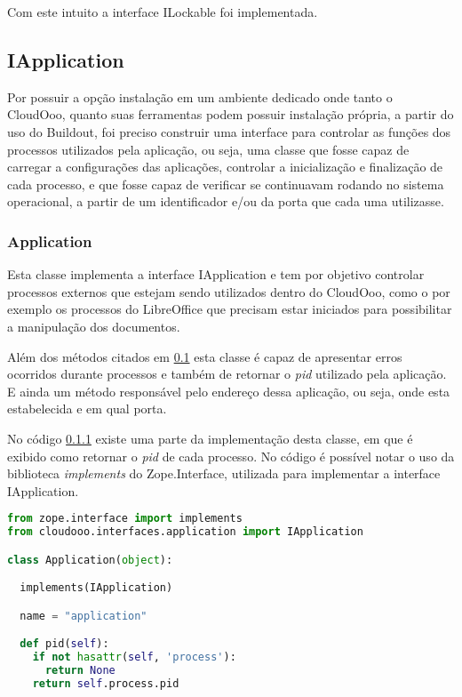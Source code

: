 Com este intuito a interface ILockable foi implementada.


\subsection{IApplication}
\label{iapplication}

Por possuir a opção instalação em um ambiente dedicado onde tanto o CloudOoo, quanto suas ferramentas podem possuir instalação própria, a partir do uso do Buildout, foi preciso construir uma interface para controlar as funções dos processos utilizados pela aplicação, ou seja, uma classe que fosse capaz de carregar a configurações das aplicações, controlar a inicialização e finalização de cada processo, e que fosse capaz de verificar se continuavam rodando no sistema operacional, a partir de um identificador e/ou da porta que cada uma utilizasse.


\subsubsection{Application}
\label{application}

Esta classe implementa a interface IApplication e tem por objetivo controlar processos externos que estejam sendo utilizados dentro do CloudOoo, como o por exemplo os processos do LibreOffice que precisam estar iniciados para possibilitar a manipulação dos documentos.

Além dos métodos citados em \ref{iapplication} esta classe é capaz de apresentar erros ocorridos durante processos e também de retornar o \textit{pid} utilizado pela aplicação. E ainda um método responsável pelo endereço dessa aplicação, ou seja, onde esta estabelecida e em qual porta.

No código \ref{application} existe uma parte da implementação desta classe, em que é exibido como retornar o \textit{pid} de cada processo. No código é possível notar o uso da biblioteca \textit{implements} do Zope.Interface, utilizada para implementar a interface IApplication.

{\singlespace
\begin{lstlisting}[caption=Trecho de código referente a função de pid,language=python,label={application}]
from zope.interface import implements
from cloudooo.interfaces.application import IApplication

class Application(object):

  implements(IApplication)

  name = "application"

  def pid(self):
    if not hasattr(self, 'process'):
      return None
    return self.process.pid
\end{lstlisting}
}

